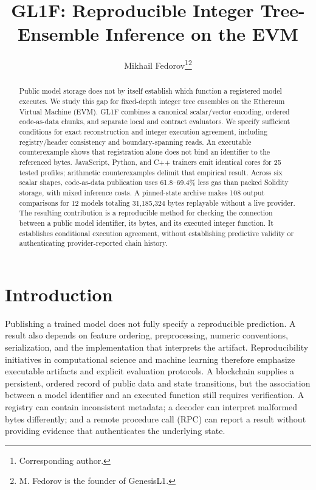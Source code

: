 \documentclass{ledger}
\title{GL1F: Reproducible Integer Tree-Ensemble Inference on the EVM}
\author{Mikhail Fedorov\thanks{Corresponding author.}\thanks{M. Fedorov is the founder of GenesisL1.}}
\begin{document}
\maketitle
\thispagestyle{pagefirst}

\begin{abstract}
Public model storage does not by itself establish which function a registered
model executes. We study this gap for fixed-depth integer tree ensembles on
the Ethereum Virtual Machine (EVM). GL1F combines a canonical scalar/vector
encoding, ordered code-as-data chunks, and separate local and contract
evaluators. We specify sufficient conditions for exact reconstruction and
integer execution agreement, including registry/header consistency and
boundary-spanning reads. An executable counterexample shows that registration
alone does not bind an identifier to the referenced bytes. JavaScript, Python,
and C++ trainers emit identical cores for 25 tested profiles; arithmetic
counterexamples delimit that empirical result. Across six scalar shapes, code-as-data publication uses 61.8--69.4\% less
gas than packed Solidity storage, with mixed inference costs. A pinned-state
archive makes 108 output comparisons for 12 models totaling 31,185,324 bytes
replayable without a live provider. The resulting contribution is a reproducible method
for checking the connection between a public model identifier, its bytes, and
its executed integer function. It establishes conditional execution agreement,
without establishing predictive validity or authenticating provider-reported
chain history.
\end{abstract}

\section{Introduction}
\label{sec:introduction}

Publishing a trained model does not fully specify a reproducible prediction.
A result also depends on feature ordering, preprocessing, numeric conventions,
serialization, and the implementation that interprets the artifact.
Reproducibility initiatives in computational science and machine learning
therefore emphasize executable artifacts and explicit evaluation protocols.
\cite{peng2011,pineau2021} A blockchain supplies a persistent, ordered record
of public data and state transitions, but the association between a model
identifier and an executed function still requires verification. A registry
can contain inconsistent metadata; a decoder can interpret malformed bytes
differently; and a remote procedure call (RPC) can report a result without
providing evidence that authenticates the underlying state.
\end{document}
